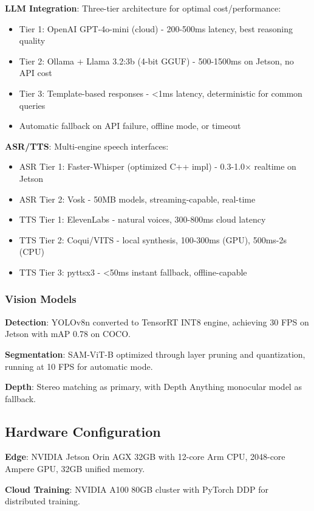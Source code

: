\documentclass[conference]{IEEEtran}
\begin{document}
\textbf{LLM Integration}: Three-tier architecture for optimal cost/performance:
\begin{itemize}
    \item Tier 1: OpenAI GPT-4o-mini (cloud) - 200-500ms latency, best reasoning quality
    \item Tier 2: Ollama + Llama 3.2:3b (4-bit GGUF) - 500-1500ms on Jetson, no API cost
    \item Tier 3: Template-based responses - <1ms latency, deterministic for common queries
    \item Automatic fallback on API failure, offline mode, or timeout
\end{itemize}

\textbf{ASR/TTS}: Multi-engine speech interfaces:
\begin{itemize}
    \item ASR Tier 1: Faster-Whisper (optimized C++ impl) - 0.3-1.0× realtime on Jetson
    \item ASR Tier 2: Vosk - 50MB models, streaming-capable, real-time
    \item TTS Tier 1: ElevenLabs - natural voices, 300-800ms cloud latency
    \item TTS Tier 2: Coqui/VITS - local synthesis, 100-300ms (GPU), 500ms-2s (CPU)
    \item TTS Tier 3: pyttsx3 - <50ms instant fallback, offline-capable
\end{itemize}

\subsubsection{Vision Models}

\textbf{Detection}: YOLOv8n converted to TensorRT INT8 engine, achieving 30 FPS on Jetson with mAP 0.78 on COCO.

\textbf{Segmentation}: SAM-ViT-B optimized through layer pruning and quantization, running at 10 FPS for automatic mode.

\textbf{Depth}: Stereo matching as primary, with Depth Anything monocular model as fallback.

\subsection{Hardware Configuration}

\textbf{Edge}: NVIDIA Jetson Orin AGX 32GB with 12-core Arm CPU, 2048-core Ampere GPU, 32GB unified memory.

\textbf{Cloud Training}: NVIDIA A100 80GB cluster with PyTorch DDP for distributed training.
\end{document}

